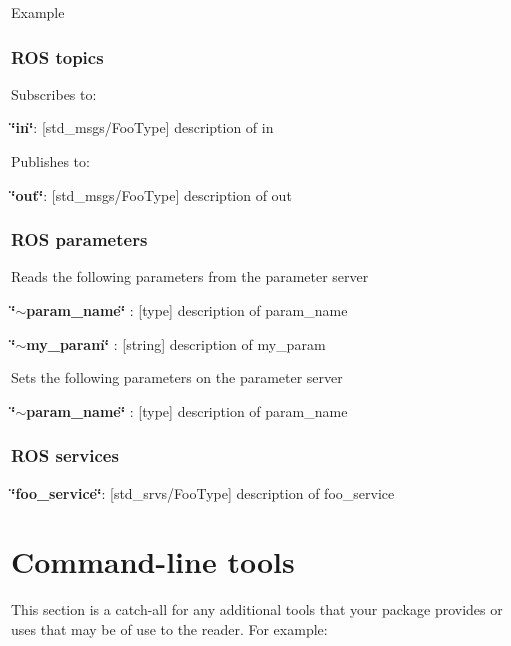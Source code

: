 \begin{DoxyParagraph}{\-Example}

\end{DoxyParagraph}
\subsubsection{\-R\-O\-S topics}\label{index_topics}
\-Subscribes to\-:
\begin{DoxyItemize}
\item {\bfseries \char`\"{}in\char`\"{}}\-: [std\-\_\-msgs/\-Foo\-Type] description of in
\end{DoxyItemize}

\-Publishes to\-:
\begin{DoxyItemize}
\item {\bfseries \char`\"{}out\char`\"{}}\-: [std\-\_\-msgs/\-Foo\-Type] description of out
\end{DoxyItemize}\subsubsection{\-R\-O\-S parameters}\label{index_parameters}
\-Reads the following parameters from the parameter server


\begin{DoxyItemize}
\item {\bfseries \char`\"{}$\sim$param\-\_\-name\char`\"{}} \-: {\bfseries }[type] description of param\-\_\-name
\item {\bfseries \char`\"{}$\sim$my\-\_\-param\char`\"{}} \-: {\bfseries }[string] description of my\-\_\-param
\end{DoxyItemize}

\-Sets the following parameters on the parameter server


\begin{DoxyItemize}
\item {\bfseries \char`\"{}$\sim$param\-\_\-name\char`\"{}} \-: {\bfseries }[type] description of param\-\_\-name
\end{DoxyItemize}\subsubsection{\-R\-O\-S services}\label{index_services}

\begin{DoxyItemize}
\item {\bfseries \char`\"{}foo\-\_\-service\char`\"{}}\-: [std\-\_\-srvs/\-Foo\-Type] description of foo\-\_\-service
\end{DoxyItemize}\section{\-Command-\/line tools}\label{index_commandline}
\-This section is a catch-\/all for any additional tools that your package provides or uses that may be of use to the reader. \-For example\-:


